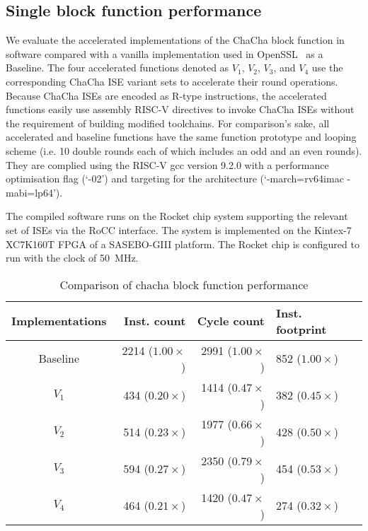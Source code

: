
\subsection{Single block function performance}
\label{sec:eval:blk}
We evaluate the accelerated implementations of the ChaCha block function in software compared with a vanilla implementation used in OpenSSL~\cite{OpenSSL} as a Baseline. The four accelerated functions denoted as $V_1$, $V_2$, $V_3$, and $V_4$ use the corresponding ChaCha ISE variant sets to accelerate their round operations. 
Because ChaCha ISEs are encoded as R-type instructions, the accelerated functions easily use assembly RISC-V directives  to invoke ChaCha ISEs without the requirement of building modified toolchains.   
For comparison's sake, all accelerated and baseline functions have the same function prototype and looping scheme (i.e. 10 double rounds each of which includes an odd and an even rounds). 
They are complied using the RISC-V gcc version 9.2.0 with a performance optimisation flag (`-02') and targeting for the  architecture (`-march=rv64imac -mabi=lp64'). 

The compiled software runs on the Rocket chip system supporting the relevant set of ISEs via the RoCC interface.
The system is implemented on the Kintex-7 XC7K160T FPGA of a SASEBO-GIII platform.
The Rocket chip is configured to run with the clock of 50~MHz.


\begin{table}[b]
\caption{Comparison of chacha block function performance}
\label{tab:res:sw:perf1}
\begin{tabular}{crrl}
\toprule            
Implementations        & Inst. count   & Cycle count & Inst. footprint\\

\midrule
Baseline & 2214 ($1.00\times$)     & 2991 ($1.00\times$) &  852 ($1.00\times$)\\
 $V_1$   &  434 ($0.20\times$)     & 1414 ($0.47\times$) &  382 ($0.45\times$)\\
 $V_2$   &  514 ($0.23\times$)     & 1977 ($0.66\times$) &  428 ($0.50\times$)\\
 $V_3$   &  594 ($0.27\times$)     & 2350 ($0.79\times$) &  454 ($0.53\times$)\\
 $V_4$   &  464 ($0.21\times$)     & 1420 ($0.47\times$) &  274 ($0.32\times$)\\

\bottomrule
\end{tabular}
\end{table}


